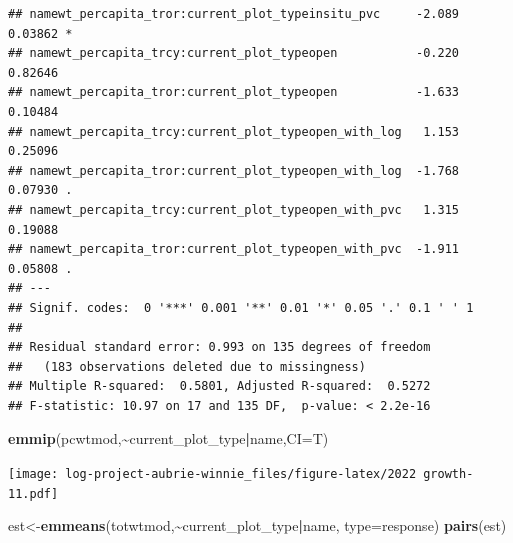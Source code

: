 \documentclass[
]{article}
\newenvironment{Shaded}{\begin{snugshade}}{\end{snugshade}}
\newcommand{\AttributeTok}[1]{\textcolor[rgb]{0.13,0.29,0.53}{#1}}
\newcommand{\FunctionTok}[1]{\textcolor[rgb]{0.13,0.29,0.53}{\textbf{#1}}}
\newcommand{\NormalTok}[1]{#1}
\newcommand{\OtherTok}[1]{\textcolor[rgb]{0.56,0.35,0.01}{#1}}
\newcommand{\SpecialCharTok}[1]{\textcolor[rgb]{0.81,0.36,0.00}{\textbf{#1}}}
\newcommand{\StringTok}[1]{\textcolor[rgb]{0.31,0.60,0.02}{#1}}
\begin{document}
\begin{verbatim}
## namewt_percapita_tror:current_plot_typeinsitu_pvc     -2.089  0.03862 *  
## namewt_percapita_trcy:current_plot_typeopen           -0.220  0.82646    
## namewt_percapita_tror:current_plot_typeopen           -1.633  0.10484    
## namewt_percapita_trcy:current_plot_typeopen_with_log   1.153  0.25096    
## namewt_percapita_tror:current_plot_typeopen_with_log  -1.768  0.07930 .  
## namewt_percapita_trcy:current_plot_typeopen_with_pvc   1.315  0.19088    
## namewt_percapita_tror:current_plot_typeopen_with_pvc  -1.911  0.05808 .  
## ---
## Signif. codes:  0 '***' 0.001 '**' 0.01 '*' 0.05 '.' 0.1 ' ' 1
## 
## Residual standard error: 0.993 on 135 degrees of freedom
##   (183 observations deleted due to missingness)
## Multiple R-squared:  0.5801, Adjusted R-squared:  0.5272 
## F-statistic: 10.97 on 17 and 135 DF,  p-value: < 2.2e-16
\end{verbatim}

\begin{Shaded}
\begin{Highlighting}[]
\FunctionTok{emmip}\NormalTok{(pcwtmod,}\SpecialCharTok{\textasciitilde{}}\NormalTok{current\_plot\_type}\SpecialCharTok{|}\NormalTok{name,}\AttributeTok{CI=}\NormalTok{T)}
\end{Highlighting}
\end{Shaded}

\texttt{[image: log-project-aubrie-winnie\_files/figure-latex/2022 growth-11.pdf]}

\begin{Shaded}
\begin{Highlighting}[]
\NormalTok{est}\OtherTok{\textless{}{-}}\FunctionTok{emmeans}\NormalTok{(totwtmod,}\SpecialCharTok{\textasciitilde{}}\NormalTok{current\_plot\_type}\SpecialCharTok{|}\NormalTok{name, }\AttributeTok{type=}\StringTok{\textquotesingle{}response\textquotesingle{}}\NormalTok{)}
\FunctionTok{pairs}\NormalTok{(est)}
\end{Highlighting}
\end{Shaded}
\end{document}
